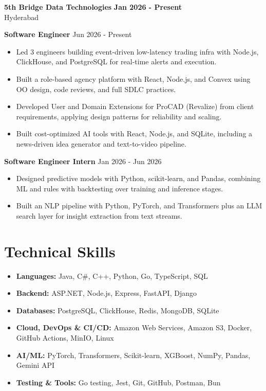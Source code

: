\documentclass[a4paper,11pt]{article}
\newcommand{\resumeItem}[1]{\item \small{#1}}
\newcommand{\resumeSubheading}[4]{%
  \textbf{#1} \hfill \textbf{#2} \\
{#3} \hfill {#4}
}
\newcommand{\resumeSubHeadingListStart}{\begin{itemize}}
\newcommand{\resumeSubHeadingListEnd}{\end{itemize}}
\begin{document}
\resumeSubheading
{5th Bridge Data Technologies}{Jan 2026 - Present}
{Hyderabad}{}

\textbf{Software Engineer} \hfill {Jun 2026 - Present}
\resumeSubHeadingListStart
\resumeItem{Led 3 engineers building event-driven low-latency trading infra with Node.js, ClickHouse, and PostgreSQL for real-time alerts and execution.}
\resumeItem{Built a role-based agency platform with React, Node.js, and Convex using OO design, code reviews, and full SDLC practices.}
\resumeItem{Developed User and Domain Extensions for ProCAD (Revalize) from client requirements, applying design patterns for reliability and scaling.}
\resumeItem{Built cost-optimized AI tools with React, Node.js, and SQLite, including a news-driven idea generator and text-to-video pipeline.}
\resumeSubHeadingListEnd

\textbf{Software Engineer Intern} \hfill {Jan 2026 - Jun 2026}
\resumeSubHeadingListStart
\resumeItem{Designed predictive models with Python, scikit-learn, and Pandas, combining ML and rules with backtesting over training and inference stages.}
\resumeItem{Built an NLP pipeline with Python, PyTorch, and Transformers plus an LLM search layer for insight extraction from text streams.}
\resumeSubHeadingListEnd


\section*{Technical Skills}
\begin{itemize}
\item \textbf{Languages:} Java, C\#, C++, Python, Go, TypeScript, SQL
\item \textbf{Backend:} ASP.NET, Node.js, Express, FastAPI, Django
\item \textbf{Databases:} PostgreSQL, ClickHouse, Redis, MongoDB, SQLite
\item \textbf{Cloud, DevOps \& CI/CD:} Amazon Web Services, Amazon S3, Docker, GitHub Actions, MinIO, Linux
\item \textbf{AI/ML:} PyTorch, Transformers, Scikit-learn, XGBoost, NumPy, Pandas, Gemini API
\item \textbf{Testing \& Tools:} Go testing, Jest, Git, GitHub, Postman, Bun
\end{itemize}
\vspace{-0.2em}
\end{document}
